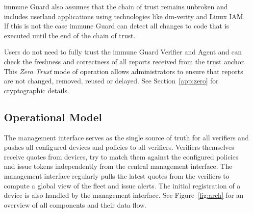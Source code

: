 \documentclass[a4paper,oneside,10pt,extrafontsizes]{memoir}
\newcommand\todo[1]{\textcolor{red}{TODO: #1\newline}}
\begin{document}
immune Guard also assumes that the chain of trust remains unbroken and includes
userland applications using technologies like dm-verity and Linux IAM. If this
is not the case immune Guard can detect all changes to code that is
executed until the end of the chain of trust.

Users do not need to fully trust the immune Guard Verifier and Agent and can
check the freshness and correctness of all reports received from the trust
anchor. This \emph{Zero Trust} mode of operation allows administrators to
ensure that reports are not changed, removed, reused or delayed. See
Section~\ref{app:zero} for cryptographic details.

%
%
%
%


\subsection*{Operational Model}

The management interface serves as the single source of truth for all verifiers and pushes all configured devices and policies to all verifiers. Verifiers themselves receive quotes from devices, try to match them against the configured policies and issue tokens independently from the central management interface. The management interface regularly pulls the latest quotes from the verifiers to compute a global view of the fleet and issue alerts. The initial registration of a device is also handled by the management interface. See Figure~\ref{fig:arch} for an overview of all components and their data flow.
\end{document}
